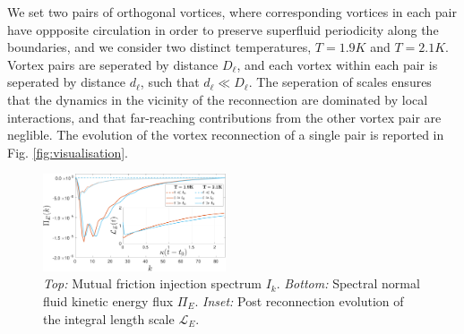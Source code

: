 \documentclass[%
 reprint,
 amsmath,amssymb,
 aps,
 prl,
]{revtex4-2}
\begin{document}
We set two pairs of orthogonal vortices, where corresponding vortices in each pair have oppposite circulation in order to preserve superfluid periodicity along the boundaries, and we consider two distinct temperatures, $T=1.9K$ and $T=2.1K$. Vortex pairs are seperated by distance $D_{\ell}$, and each vortex within each pair is seperated by distance $d_{\ell}$, such that $d_{\ell}\ll D_{\ell}$. The seperation of scales ensures that the dynamics in the vicinity of the reconnection are dominated by local interactions, and that far-reaching contributions from the other vortex pair are neglible. The evolution of the vortex reconnection of a single pair is reported in Fig. \ref{fig:visualisation}. 
\begin{figure}[t]
    \centering
    \includegraphics*[width=0.48\textwidth]{flux-spec.pdf}
\caption{\emph{Top:} Mutual friction injection spectrum $I_k$. \emph{Bottom:} Spectral normal fluid kinetic energy flux $\Pi_E$. \emph{Inset:} Post reconnection evolution of the integral length scale $\mathcal{L}_E$.}
\label{fig:energy-flux}
\end{figure}
\end{document}
